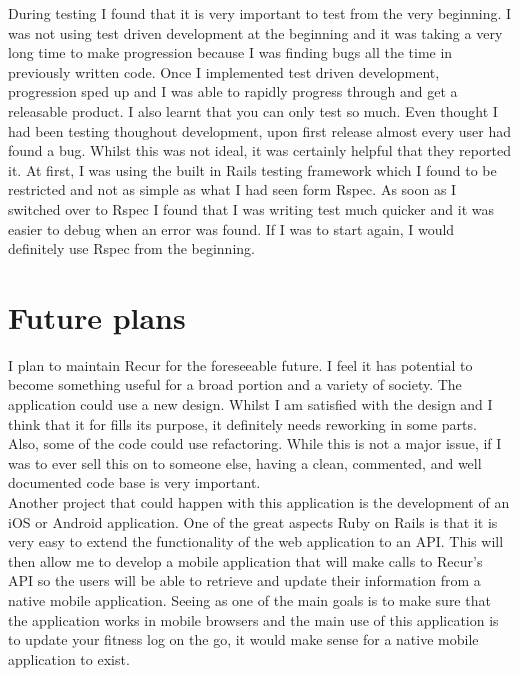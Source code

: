 During testing I found that it is very important to test from the very beginning. I was not using test driven development at the beginning and it was taking a very long time to make progression because I was finding bugs all the time in previously written code. Once I implemented test driven development, progression sped up and I was able to rapidly progress through and get a releasable product. I also learnt that you can only test so much. Even thought I had been testing thoughout development, upon first release almost every user had found a bug. Whilst this was not ideal, it was certainly helpful that they reported it. At first, I was using the built in Rails testing framework which I found to be restricted and not as simple as what I had seen form Rspec. As soon as I switched over to Rspec I found that I was writing test much quicker and it was easier to debug when an error was found. If I was to start again, I would definitely use Rspec from the beginning.

\section{Future plans}
I plan to maintain Recur for the foreseeable future. I feel it has potential to become something useful for a broad portion and a variety of society. The application could use a new design. Whilst I am satisfied with the design and I think that it for fills its purpose, it definitely needs reworking in some parts. Also, some of the code could use refactoring. While this is not a major issue, if I was to ever sell this on to someone else, having a clean, commented, and well documented code base is very important. \\

Another project that could happen with this application is the development of an iOS or Android application. One of the great aspects Ruby on Rails is that it is very easy to extend the functionality of the web application to an API. This will then allow me to develop a mobile application that will make calls to Recur's API so the users will be able to retrieve and update their information from a native mobile application. Seeing as one of the main goals is to make sure that the application works in mobile browsers and the main use of this application is to update your fitness log on the go, it would make sense for a native mobile application to exist.
